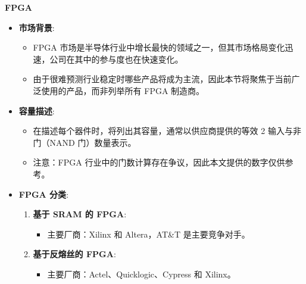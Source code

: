 \documentclass[
  ignorenonframetext,
  chinese,
]{beamer}
\providecommand{\tightlist}{%
  \setlength{\itemsep}{0pt}\setlength{\parskip}{0pt}}
\begin{document}
\begin{frame}{\textbf{FPGA}}
\label{fpga}
\begin{itemize}
\tightlist
\item
  \textbf{市场背景}:

  \begin{itemize}
  \tightlist
  \item
    FPGA
    市场是半导体行业中增长最快的领域之一，但其市场格局变化迅速，公司在其中的参与度也在快速变化。
  \item
    由于很难预测行业稳定时哪些产品将成为主流，因此本节将聚焦于当前广泛使用的产品，而非列举所有
    FPGA 制造商。
  \end{itemize}
\item
  \textbf{容量描述}:

  \begin{itemize}
  \tightlist
  \item
    在描述每个器件时，将列出其容量，通常以供应商提供的等效 2
    输入与非门（NAND 门）数量表示。
  \item
    注意：FPGA 行业中的门数计算存在争议，因此本文提供的数字仅供参考。
  \end{itemize}
\item
  \textbf{FPGA 分类}:

  \begin{enumerate}
  \tightlist
  \item
    \textbf{基于 SRAM 的 FPGA}:

    \begin{itemize}
    \tightlist
    \item
      主要厂商：Xilinx 和 Altera，AT\&T 是主要竞争对手。
    \end{itemize}
  \item
    \textbf{基于反熔丝的 FPGA}:

    \begin{itemize}
    \tightlist
    \item
      主要厂商：Actel、Quicklogic、Cypress 和 Xilinx。
    \end{itemize}
  \end{enumerate}
\end{itemize}
\end{frame}
\end{document}
